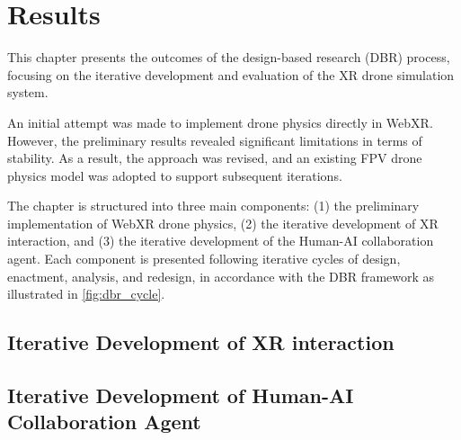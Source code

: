 
\newpage
\section{Results}

This chapter presents the outcomes of the design-based research (DBR) process, focusing on the iterative development and evaluation of the XR drone simulation system.

An initial attempt was made to implement drone physics directly in WebXR. However, the preliminary results revealed significant limitations in terms of stability. As a result, the approach was revised, and an existing FPV drone physics model \parencite{yuetility2022fpvphysics} was adopted to support subsequent iterations.

The chapter is structured into three main components: (1) the preliminary implementation of WebXR drone physics, (2) the iterative development of XR interaction, and (3) the iterative development of the Human-AI collaboration agent. Each component is presented following iterative cycles of design, enactment, analysis, and redesign, in accordance with the DBR framework as illustrated in \cref{fig:dbr_cycle}.



\subsection{Iterative Development of XR interaction}







\subsection{Iterative Development of Human-AI Collaboration Agent}








